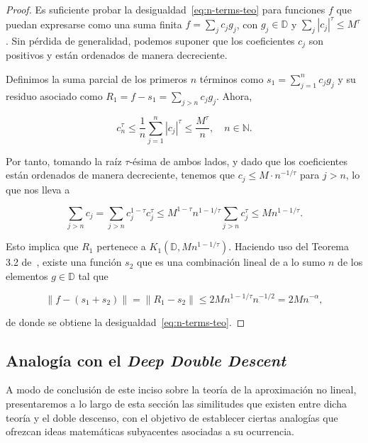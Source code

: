 \begin{proof}
    Es suficiente probar la desigualdad~\eqref{eq:n-terms-teo} para funciones $f$ que puedan expresarse como una suma finita $f = \sum_j c_j g_j$, con $g_j \in \mathbb{D}$ y $\sum_j |c_j|^\tau \leq M^\tau$. Sin pérdida de generalidad, podemos suponer que los coeficientes $c_j$ son positivos y están ordenados de manera decreciente.\newline
    
    Definimos la suma parcial de los primeros $n$ términos como $s_1 = \sum_{j=1}^{n} c_j g_j$ y su residuo asociado como $R_1 = f - s_1 = \sum_{j>n} c_j g_j$. Ahora,

    \[
        c_n^\tau \leq \frac{1}{n} \sum_{j=1}^{n} |c_j|^\tau \leq \frac{M^\tau}{n}, \quad n \in \mathbb{N}.
    \]

    Por tanto, tomando la raíz $ \tau $-ésima de ambos lados, y dado que los coeficientes están ordenados de manera decreciente, tenemos que $ c_j \leq M \cdot n^{-1/\tau} $ para $ j > n $, lo que nos lleva a

    \[
        \sum_{j>n} c_j = \sum_{j>n} c_j^{1-\tau} c_j^\tau \leq M^{1-\tau} n^{1-1/\tau} \sum_{j>n} c_j^\tau \leq M n^{1-1/\tau}.
    \]

    Esto implica que $R_1$ pertenece a $K_1(\mathbb{D}, M n^{1 - 1/\tau})$. Haciendo uso del Teorema 3.2 de~\cite{DeVore1996}, existe una función $s_2$ que es una combinación lineal de a lo sumo $n$ de los elementos $g \in \mathbb{D}$ tal que

    \[
        \| f - (s_1 + s_2) \| = \| R_1 - s_2 \| \leq 2M n^{1-1/\tau} n^{-1/2} = 2M n^{-\alpha},
    \]

    de donde se obtiene la desigualdad~\eqref{eq:n-terms-teo}.\newline
\end{proof}

\subsection{Analogía con el \textit{Deep Double Descent}}\label{subsec:analogia-matematica-ddd}

A modo de conclusión de este inciso sobre la teoría de la aproximación no lineal, presentaremos a lo largo de esta sección las similitudes que existen entre dicha teoría y el doble descenso, con el objetivo de establecer ciertas analogías que ofrezcan ideas matemáticas subyacentes asociadas a su ocurrencia.\newline

